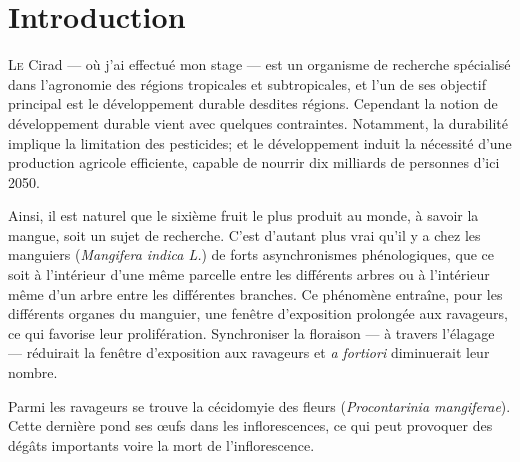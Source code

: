 \chapter{Introduction}

\lettrine{L}{e} Cirad --- où j'ai effectué mon stage --- est un organisme de recherche spécialisé dans l'agronomie des régions tropicales et subtropicales, et l'un de ses objectif principal est le développement durable desdites régions.
Cependant la notion de développement durable vient avec quelques contraintes.
Notamment, la durabilité implique la limitation des pesticides; et le développement induit la nécessité d'une production agricole efficiente, capable de nourrir dix milliards de personnes d'ici 2050.

Ainsi, il est naturel que le sixième fruit le plus produit au monde, à savoir la mangue, soit un sujet de recherche.
C'est d'autant plus vrai qu'il y a chez les manguiers (\emph{Mangifera indica L.}) de forts asynchronismes phénologiques, que ce soit à l'intérieur d'une même parcelle entre les différents arbres ou à l'intérieur même d'un arbre entre les différentes branches. 
Ce phénomène entraîne, pour les différents organes du manguier, une fenêtre d'exposition prolongée aux ravageurs, ce qui favorise leur prolifération. 
Synchroniser la floraison --- à travers l'élagage --- réduirait la fenêtre d'exposition aux ravageurs et \emph{a fortiori} diminuerait leur nombre.

Parmi les ravageurs se trouve la cécidomyie des fleurs (\emph{Procontarinia mangiferae}). Cette dernière pond ses œufs dans les inflorescences, ce qui peut provoquer des dégâts importants voire la mort de l'inflorescence.


